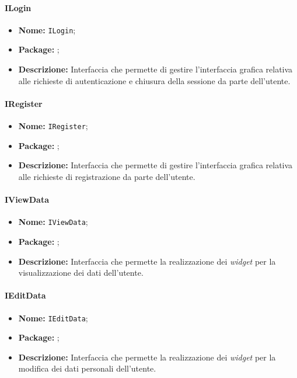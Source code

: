 \paragraph{ILogin}
\begin{itemize}
\item \textbf{Nome:} \texttt{ILogin};
\item \textbf{Package:} \texttt{\iViewUser{}};
\item \textbf{Descrizione:} Interfaccia che permette di gestire l'interfaccia grafica relativa alle richieste di autenticazione e chiusura della sessione da parte dell'utente.
\end{itemize}

\paragraph{IRegister}
\begin{itemize}
\item \textbf{Nome:} \texttt{IRegister};
\item \textbf{Package:} \texttt{\iViewUser{}};
\item \textbf{Descrizione:} Interfaccia che permette di gestire l'interfaccia grafica relativa alle richieste di registrazione da parte dell'utente.
\end{itemize}

\paragraph{IViewData}
\begin{itemize}
\item \textbf{Nome:} \texttt{IViewData};
\item \textbf{Package:} \texttt{\iViewUser{}};
\item \textbf{Descrizione:} Interfaccia che permette la realizzazione dei \textit{widget} per la visualizzazione dei dati dell'utente.
\end{itemize}

\paragraph{IEditData}
\begin{itemize}
\item \textbf{Nome:} \texttt{IEditData};
\item \textbf{Package:} \texttt{\iViewUser{}};
\item \textbf{Descrizione:} Interfaccia che permette la realizzazione dei \textit{widget} per la modifica dei dati personali dell'utente.
\end{itemize}

